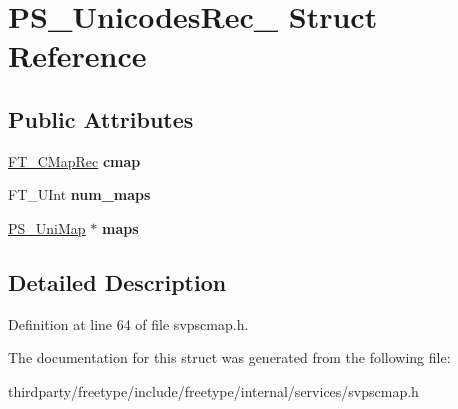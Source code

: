 \hypertarget{struct_p_s___unicodes_rec__}{}\section{P\+S\+\_\+\+Unicodes\+Rec\+\_\+ Struct Reference}
\label{struct_p_s___unicodes_rec__}
\subsection*{Public Attributes}
\begin{DoxyCompactItemize}
\item 
\mbox{\label{struct_p_s___unicodes_rec___a4c3e28cb86c8a7039107437dcf995da7}} 
\hyperlink{struct_f_t___c_map_rec__}{F\+T\+\_\+\+C\+Map\+Rec} {\bfseries cmap}
\item 
\mbox{\label{struct_p_s___unicodes_rec___abbc3617f13363ddcf851ee229752b08d}} 
F\+T\+\_\+\+U\+Int {\bfseries num\+\_\+maps}
\item 
\mbox{\label{struct_p_s___unicodes_rec___abd0ff1abe19a2a6a838b631ec81d22cd}} 
\hyperlink{struct_p_s___uni_map__}{P\+S\+\_\+\+Uni\+Map} $\ast$ {\bfseries maps}
\end{DoxyCompactItemize}


\subsection{Detailed Description}


Definition at line 64 of file svpscmap.\+h.



The documentation for this struct was generated from the following file\+:\begin{DoxyCompactItemize}
\item 
thirdparty/freetype/include/freetype/internal/services/svpscmap.\+h\end{DoxyCompactItemize}
